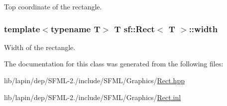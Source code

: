 Top coordinate of the rectangle. 

\hypertarget{classsf_1_1_rect_a4dd5b9d4333bebbc51bd309298fd500f}{
\subsubsection[{width}]{\setlength{\rightskip}{0pt plus 5cm}template$<$typename T$>$ {\bf T} {\bf sf\-::\-Rect}$<$ {\bf T} $>$\-::width}}\label{classsf_1_1_rect_a4dd5b9d4333bebbc51bd309298fd500f}


Width of the rectangle. 



The documentation for this class was generated from the following files\-:\begin{DoxyCompactItemize}
\item 
lib/lapin/dep/\-S\-F\-M\-L-\/2./include/\-S\-F\-M\-L/\-Graphics/\hyperlink{lapin_2dep_2_s_f_m_l-2_83_2include_2_s_f_m_l_2_graphics_2_rect_8hpp}{Rect.\-hpp}\item 
lib/lapin/dep/\-S\-F\-M\-L-\/2./include/\-S\-F\-M\-L/\-Graphics/\hyperlink{lapin_2dep_2_s_f_m_l-2_83_2include_2_s_f_m_l_2_graphics_2_rect_8inl}{Rect.\-inl}\end{DoxyCompactItemize}
